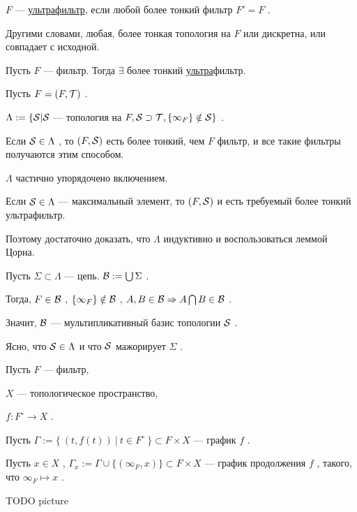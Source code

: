\SSsect[def] \( F \) --- \underline{ультрафильтр}, если любой более тонкий фильтр \( F' = F \) .

Другими словами, любая, более тонкая топология на \( F\) или дискретна, или совпадает с исходной.

\SSsect[!] Пусть \( F \) --- фильтр. Тогда \( \exists \) более тонкий \underline{ультра}фильтр.

\SSproof

Пусть \( F = (F,\mathcal{T}) \) .

\( \Lambda := \{ \mathcal{S} | \mathcal{S} \) --- топология на \( F, \mathcal{S} \supset \mathcal{T} , \{\infty_F\} \notin \mathcal{S} \} \) .

Если \( \mathcal{S} \in \Lambda \) , то \( (F,\mathcal{S}) \) есть более тонкий, чем \( F \) фильтр, и все такие фильтры получаются этим способом.

\( \Lambda \) частично упорядочено включением.

Если \( \mathcal{S} \in \Lambda \) --- максимальный элемент, то \( (F,\mathcal{S}) \) и есть требуемый более тонкий ультрафильтр.

Поэтому достаточно доказать, что \( \Lambda \) индуктивно и воспользоваться леммой Цорна.

Пусть \( \Sigma \subset \Lambda \) --- цепь. \( \mathcal{B} := \bigcup \Sigma \) .

Тогда, \( F \in \mathcal{B} \) , \( \{\infty_F\} \notin \mathcal{B} \) , \( A,B \in \mathcal{B}  \Rightarrow A \bigcap B \in \mathcal{B} \) .

Значит, \( \mathcal{B} \) --- мультипликативный базис топологии \( \mathcal{S} \) .

Ясно, что \( \mathcal{S} \in \Lambda \) и что \( \mathcal{S} \) мажорирует \( \Sigma \) .

\SSendp

\pagebreak

\SSbullet 

\vspace

\begin{center}
Пусть \( F \) --- фильтр,

\( X \) --- топологическое пространство,

\( f: F^\circ \rightarrow X  \) .
\end{center}

\SSsect Пусть \( \Gamma := \{~ (t,f(t)) ~|~ t \in F^\circ ~\} \subset F \times X \) --- график \( f \) .

Пусть \( x \in X \) , \( \Gamma_x := \Gamma \cup \{ (\infty_F,x) \} \subset F \times X \) --- график продолжения \( f \) , такого, что \( \infty_F \mapsto x \) .

TODO picture

